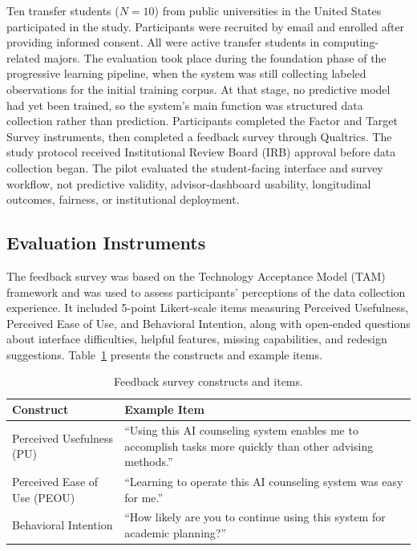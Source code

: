 \documentclass[letterpaper,11pt]{article}
\newcommand{\DIFadd}[1]{%
  \begingroup\setlength{\fboxsep}{0.5pt}%
  \colorbox{diffaddbg}{\textcolor{diffaddtext}{#1}}%
  \endgroup}
\begin{document}
Ten transfer students ($N=10$) from public universities in the United States participated in the study. Participants were recruited by email and enrolled after providing informed consent. All were active transfer students in computing-related majors. The evaluation took place during the foundation phase of the progressive learning pipeline, when the system was still collecting labeled observations for the initial training corpus. At that stage, no predictive model had yet been trained, so the system's main function was structured data collection rather than prediction. Participants completed the Factor and Target Survey instruments, then completed a feedback survey through Qualtrics. The study protocol received Institutional Review Board (IRB) approval before data collection began. \DIFadd{The} \DIFadd{pilot} \DIFadd{evaluated} \DIFadd{the} \DIFadd{student-facing} \DIFadd{interface} \DIFadd{and} \DIFadd{survey} \DIFadd{workflow,} \DIFadd{not} \DIFadd{predictive} \DIFadd{validity,} \DIFadd{advisor-dashboard} \DIFadd{usability,} \DIFadd{longitudinal} \DIFadd{outcomes,} \DIFadd{fairness,} \DIFadd{or} \DIFadd{institutional} \DIFadd{deployment.}

\subsection{Evaluation Instruments}\label{subsec:instruments}

The feedback survey was based on the Technology Acceptance Model (TAM) framework \parencite{davis1989} and was used to assess participants' perceptions of the data collection experience. It included 5-point Likert-scale items measuring Perceived Usefulness, Perceived Ease of Use, and Behavioral Intention, along with open-ended questions about interface difficulties, helpful features, missing capabilities, and redesign suggestions. Table~\ref{tab:constructs} presents the constructs and example items.

\begin{table}[htbp]
\centering
\caption{Feedback survey constructs and items.}
\label{tab:constructs}
\begin{tabular}{@{}lp{8cm}@{}}
\toprule
\textbf{Construct} & \textbf{Example Item} \\
\midrule
Perceived Usefulness (PU) & ``Using this AI counseling system enables me to accomplish tasks more quickly than other advising methods.'' \\
Perceived Ease of Use (PEOU) & ``Learning to operate this AI counseling system was easy for me.'' \\
Behavioral Intention & ``How likely are you to continue using this system for academic planning?'' \\
\bottomrule
\end{tabular}
\end{table}
\end{document}
